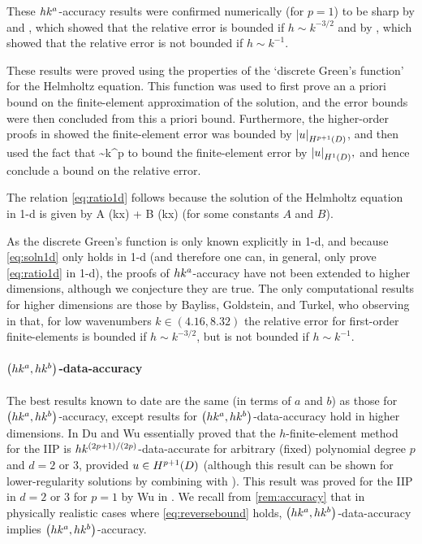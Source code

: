 These $hk^{a}$-accuracy results were confirmed numerically (for $p=1$) to be sharp by \cite[Figure 11]{IhBa:95a} and \cite[Figure 4.13]{Ih:98}, which showed that the relative error is bounded if $h \sim k^{-3/2}$ and by \cite[Figure 4.10]{Ih:98}, which showed that the relative error is not bounded if $h \sim k^{-1}.$

These results were proved using the properties of the `discrete Green's function' for the Helmholtz equation. This function was used to first prove an a priori bound on the finite-element approximation of the solution, and the error bounds were then concluded from this a priori bound. Furthermore, the higher-order proofs in \cite{IhBa:97,Ih:98} showed the finite-element error was bounded by $\SNHppoD{u}$, and then used the fact that
\beq\label{eq:ratio1d}
 \sim k^p
\eeq
to bound the finite-element error by $\SNHoD{u},$ and hence conclude a bound on the relative error.

The relation \cref{eq:ratio1d} follows because the solution of the Helmholtz equation in 1-d is given by
\beq\label{eq:soln1d}
A \cos(kx) + B \sin(kx)
\eeq
(for some constants $A$ and $B$).

As the discrete Green's function is only known explicitly in 1-d, and because \cref{eq:soln1d} only holds in 1-d (and therefore one can, in general, only prove \cref{eq:ratio1d} in 1-d), the proofs of $hk^{a}$-accuracy have not been extended to higher dimensions, although we conjecture they are true.  The only computational results for higher dimensions are those by Bayliss, Goldstein, and Turkel, who observing in \cite[Section 3, Tables 1--3]{BaGoTu:85} that, for low wavenumbers $k \in (4.16,8.32)$ the relative error for first-order finite-elements is bounded if $h \sim k^{-3/2}$, but is not bounded if $h \sim k^{-1}.$

\paragraph{$\hk{a}b$-data-accuracy} The best results known to date are the same (in terms of $a$ and $b$) as those for $\hk{a}b$-accuracy, except results for $\hk{a}b$-data-accuracy hold in higher dimensions. In \cite[Theorem 5.1, Corollary 5.2]{DuWu:15} Du and Wu essentially proved that the $h$-finite-element method for the IIP is $hk^{(2p+1)/(2p)}$-data-accurate for arbitrary (fixed) polynomial degree $p$ and $d = 2$ or $3$, provided $u \in \HppoD$ (although this result can be shown for lower-regularity solutions by combining \cite[Theorem 5.1]{DuWu:15} with \cite[Lemma 3.5]{DuWu:15}). This result was proved for the IIP in $d = 2$ or $3$ for $p=1$ by Wu in \cite{Wu:14}. We recall from \cref{rem:accuracy} that in physically realistic cases where \cref{eq:reversebound} holds, $\hk{a}{b}$-data-accuracy implies $\hk{a}{b}$-accuracy.

